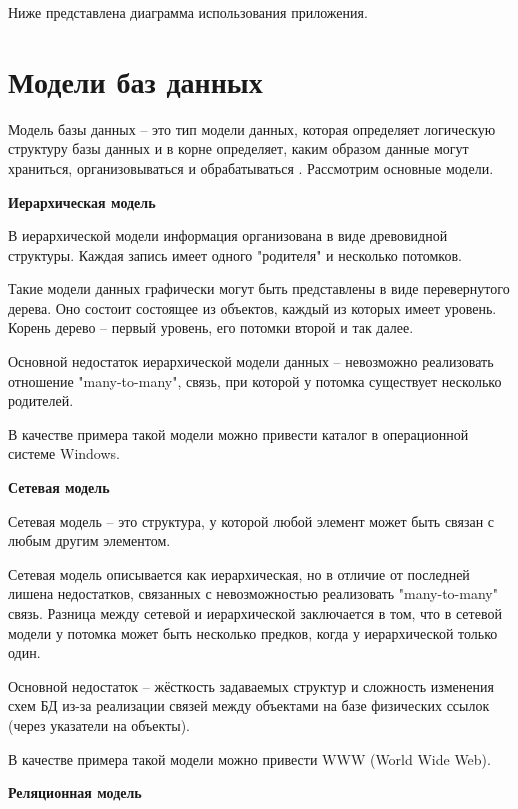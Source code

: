 Ниже представлена диаграмма использования приложения.


\clearpage

\section{Модели баз данных}

Модель базы данных -- это тип модели данных, которая определяет логическую структуру базы данных и в корне определяет, каким образом данные могут храниться, организовываться и обрабатываться \cite{db-model}.
Рассмотрим основные модели.  

\noindent\textbf{Иерархическая модель}

В иерархической модели информация организована в виде древовидной структуры.  
Каждая запись имеет одного "родителя" и несколько потомков. 

Такие модели данных графически могут быть представлены в виде перевернутого дерева.  
Оно состоит состоящее из объектов, каждый из которых имеет уровень. Корень дерево -- первый уровень, его потомки второй и так далее.

Основной недостаток иерархической модели данных -- невозможно реализовать отношение "many-to-many", связь, при которой у потомка существует несколько родителей.  

В качестве примера такой модели можно привести каталог в операционной системе Windows.  

\noindent\textbf{Сетевая модель}

Сетевая модель -- это структура, у которой любой элемент может быть связан с любым другим элементом.  

Сетевая модель описывается как иерархическая, но в отличие от последней лишена недостатков, связанных с невозможностью реализовать "many-to-many" связь.  
Разница между сетевой и иерархической заключается в том, что в сетевой модели у потомка может быть несколько предков, когда у иерархической только один.  

Основной недостаток -- жёсткость задаваемых структур и сложность изменения схем БД из-за реализации связей между объектами на базе физических ссылок (через указатели на объекты).  

В качестве примера такой модели можно привести WWW (World Wide Web).  

\noindent\textbf{Реляционная модель}

